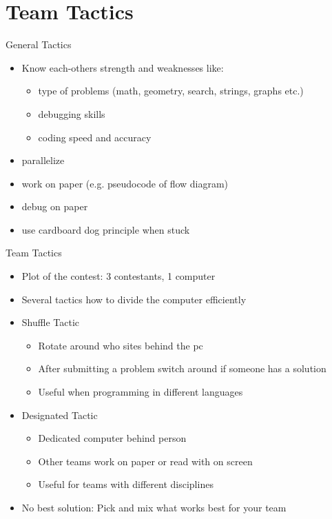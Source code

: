 \documentclass[11pt,pdf, aspectratio=169]{beamer}
\begin{document}
  \section{Team Tactics}
  \begin{frame}{General Tactics}
    \begin{itemize}
      \item Know each-others strength and weaknesses like:
      \begin{itemize}
        \item type of problems (math, geometry, search, strings, graphs etc.)
        \item debugging skills
        \item coding speed and accuracy
      \end{itemize}
      \item parallelize
      \item work on paper (e.g. pseudocode of flow diagram)
      \item debug on paper
      \item use cardboard dog principle when stuck
    \end{itemize}
  \end{frame}
  \begin{frame}{Team Tactics}
    \begin{itemize}
      \item<1-> Plot of the contest: 3 contestants, 1 computer
      \item<2-> Several tactics how to divide the computer efficiently
      \item<3-> Shuffle Tactic\begin{itemize}
                                \item<4-> Rotate around who sites behind the pc
                                \item<4-> After submitting a problem switch around if someone has a solution
                                \item<4-> Useful when programming in different languages
      \end{itemize}
      \item<3-> Designated Tactic\begin{itemize}
                                   \item<5->Dedicated computer behind person
                                   \item<5-> Other teams work on paper or read with on screen
                                   \item<5-> Useful for teams with different disciplines
      \end{itemize}
      \item<3-> No best solution: Pick and mix what works best for your team
    \end{itemize}
  \end{frame}
\end{document}
